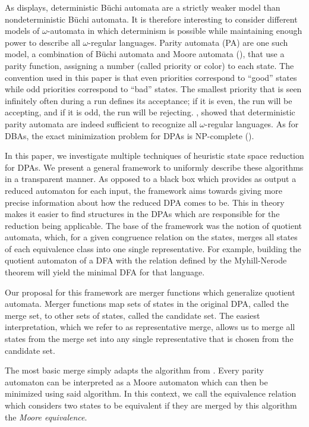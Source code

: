 As \cite{Thomas1991} displays, deterministic B\"uchi automata are a strictly weaker model than nondeterministic Büchi automata. It is therefore interesting to consider different models of $\omega$-automata in which determinism is possible while maintaining enough power to describe all $\omega$-regular languages. 
Parity automata (PA) are one such model, a combination of B\"uchi automata and Moore automata (\cite{Moore56}), that use a parity function, assigning a number (called priority or color) to each state. The convention used in this paper is that even priorities correspond to \enquote{good} states while odd priorities correspond to \enquote{bad} states. The smallest priority that is seen infinitely often during a run defines its acceptance; if it is even, the run will be accepting, and if it is odd, the run will be rejecting.
\cite{Mostowski1991}, \cite{Thomas1997} showed that deterministic parity automata are indeed sufficient to recognize all $\omega$-regular languages. As for DBAs, the exact minimization problem for DPAs is NP-complete (\cite{Schewe2010}).

\vspace{5pt}

In this paper, we investigate multiple techniques of heuristic state space reduction for DPAs. We present a general framework to uniformly describe these algorithms in a transparent manner. As opposed to a black box which provides as output a reduced automaton for each input, the framework aims towards giving more precise information about how the reduced DPA comes to be. This in theory makes it easier to find structures in the DPAs which are responsible for the reduction being applicable.
The base of the framework was the notion of quotient automata, which, for a given congruence relation on the states, merges all states of each equivalence class into one single representative. For example, building the quotient automaton of a DFA with the relation defined by the Myhill-Nerode theorem \cite{} will yield the minimal DFA for that language.

Our proposal for this framework are merger functions which generalize quotient automata. Merger functions map sets of states in the original DPA, called the merge set, to other sets of states, called the candidate set. The easiest interpretation, which we refer to as representative merge, allows us to merge all states from the merge set into any single representative that is chosen from the candidate set.

The most basic merge simply adapts the algorithm from \cite{Hopcroft1971}. Every parity automaton can be interpreted as a Moore automaton which can then be minimized using said algorithm. In this context, we call the equivalence relation which considers two states to be equivalent if they are merged by this algorithm the \emph{Moore equivalence}. 

